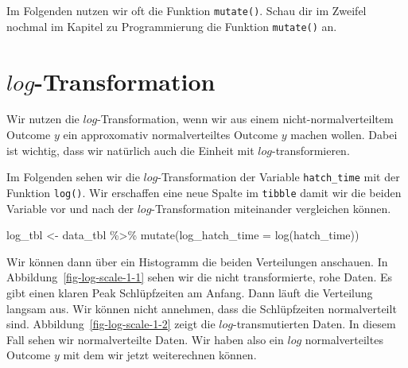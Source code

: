 \documentclass[
  letterpaper,
]{scrbook}
\newenvironment{Shaded}{\begin{snugshade}}{\end{snugshade}}
\newcommand{\AttributeTok}[1]{\textcolor[rgb]{0.40,0.45,0.13}{#1}}
\newcommand{\FunctionTok}[1]{\textcolor[rgb]{0.28,0.35,0.67}{#1}}
\newcommand{\NormalTok}[1]{\textcolor[rgb]{0.00,0.23,0.31}{#1}}
\newcommand{\OtherTok}[1]{\textcolor[rgb]{0.00,0.23,0.31}{#1}}
\newcommand{\SpecialCharTok}[1]{\textcolor[rgb]{0.37,0.37,0.37}{#1}}
\begin{document}
Im Folgenden nutzen wir oft die Funktion \texttt{mutate()}. Schau dir im
Zweifel nochmal im Kapitel zu Programmierung die Funktion
\texttt{mutate()} an.

\hypertarget{log-transformation}{%
\section{\texorpdfstring{\(log\)-Transformation}{log-Transformation}}\label{log-transformation}}

Wir nutzen die \(log\)-Transformation, wenn wir aus einem
nicht-normalverteiltem Outcome \(y\) ein approxomativ normalverteiltes
Outcome \(y\) machen wollen. Dabei ist wichtig, dass wir natürlich auch
die Einheit mit \(log\)-transformieren.

Im Folgenden sehen wir die \(log\)-Transformation der Variable
\texttt{hatch\_time} mit der Funktion \texttt{log()}. Wir erschaffen
eine neue Spalte im \texttt{tibble} damit wir die beiden Variable vor
und nach der \(log\)-Transformation miteinander vergleichen können.

\begin{Shaded}
\begin{Highlighting}[]
\NormalTok{log\_tbl }\OtherTok{\textless{}{-}}\NormalTok{ data\_tbl }\SpecialCharTok{\%\textgreater{}\%} 
  \FunctionTok{mutate}\NormalTok{(}\AttributeTok{log\_hatch\_time =} \FunctionTok{log}\NormalTok{(hatch\_time))}
\end{Highlighting}
\end{Shaded}

Wir können dann über ein Histogramm die beiden Verteilungen anschauen.
In Abbildung~\ref{fig-log-scale-1-1} sehen wir die nicht transformierte,
rohe Daten. Es gibt einen klaren Peak Schlüpfzeiten am Anfang. Dann
läuft die Verteilung langsam aus. Wir können nicht annehmen, dass die
Schlüpfzeiten normalverteilt sind. Abbildung~\ref{fig-log-scale-1-2}
zeigt die \(log\)-transmutierten Daten. In diesem Fall sehen wir
normalverteilte Daten. Wir haben also ein \(log\) normalverteiltes
Outcome \(y\) mit dem wir jetzt weiterechnen können.
\end{document}
